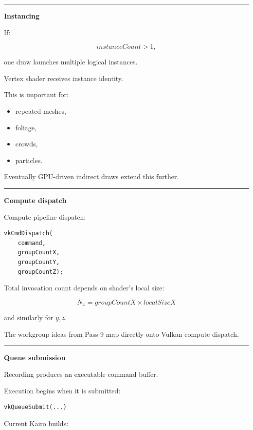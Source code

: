 \begin{center}\rule{0.5\linewidth}{0.5pt}\end{center}

\textbf{Instancing}

If:

\[
instanceCount>1,
\]

one draw launches multiple logical instances.

Vertex shader receives instance identity.

This is important for:

\begin{itemize}
\tightlist
\item
  repeated meshes,
\item
  foliage,
\item
  crowds,
\item
  particles.
\end{itemize}

Eventually GPU-driven indirect draws extend this further.

\begin{center}\rule{0.5\linewidth}{0.5pt}\end{center}

\textbf{Compute dispatch}

Compute pipeline dispatch:

\begin{verbatim}
vkCmdDispatch(
    command,
    groupCountX,
    groupCountY,
    groupCountZ);
\end{verbatim}

Total invocation count depends on shader's local size:

\[
N_x=
groupCountX\times localSizeX
\]

and similarly for \(y,z\).

The workgroup ideas from Pass 9 map directly onto Vulkan compute dispatch.

\begin{center}\rule{0.5\linewidth}{0.5pt}\end{center}

\textbf{Queue submission}

Recording produces an executable command buffer.

Execution begins when it is submitted:

\begin{verbatim}
vkQueueSubmit(...)
\end{verbatim}

Current Kairo builds:

